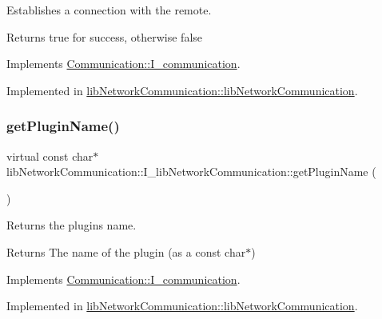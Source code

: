 Establishes a connection with the remote. 

\begin{DoxyReturn}{Returns}
true for success, otherwise false 
\end{DoxyReturn}


Implements \mbox{\hyperlink{classCommunication_1_1I__communication_a2e602d8d262f409c36d4170898c61023}{Communication\+::\+I\+\_\+communication}}.



Implemented in \mbox{\hyperlink{classlibNetworkCommunication_1_1libNetworkCommunication_a93730e78b0aeef62fc45974a26ecc3c0}{lib\+Network\+Communication\+::lib\+Network\+Communication}}.

\mbox{\label{classlibNetworkCommunication_1_1I__libNetworkCommunication_aa4a1a2180bdbf7b13ec0dd17f3cbb459}} 
\subsubsection{\texorpdfstring{getPluginName()}{getPluginName()}}
{\footnotesize\ttfamily virtual const char$\ast$ lib\+Network\+Communication\+::\+I\+\_\+lib\+Network\+Communication\+::get\+Plugin\+Name (\begin{DoxyParamCaption}{ }\end{DoxyParamCaption})\hspace{0.3cm}{\ttfamily [pure virtual]}}



Returns the plugins name. 

\begin{DoxyReturn}{Returns}
The name of the plugin (as a const char$\ast$) 
\end{DoxyReturn}


Implements \mbox{\hyperlink{classCommunication_1_1I__communication_a5ef61375a8126f29c38cc1aa17339563}{Communication\+::\+I\+\_\+communication}}.



Implemented in \mbox{\hyperlink{classlibNetworkCommunication_1_1libNetworkCommunication_a2d09c69b582a66b37100ce87ee1acdd1}{lib\+Network\+Communication\+::lib\+Network\+Communication}}.


